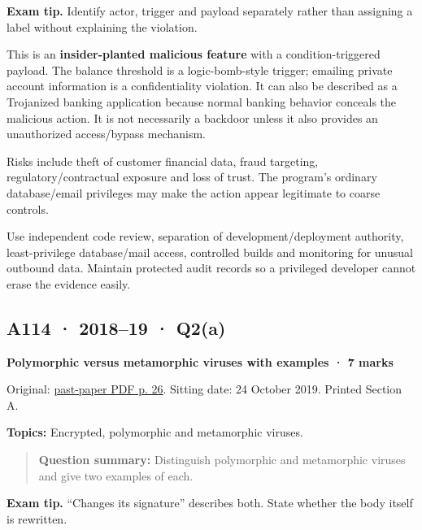 \documentclass[11pt,a4paper]{article}
\begin{document}
{\color{ForestGreen}\textbf{Exam tip.} Identify actor,\allowbreak{} trigger and payload separately rather than assigning a label without explaining the violation.}


This is an \textbf{insider-planted malicious feature} with a condition-triggered payload. The balance threshold is a logic-bomb-style trigger; emailing private account information is a confidentiality violation. It can also be described as a Trojanized banking application because normal banking behavior conceals the malicious action. It is not necessarily a backdoor unless it also provides an unauthorized access/\allowbreak{}bypass mechanism.


Risks include theft of customer financial data,\allowbreak{} fraud targeting,\allowbreak{} regulatory/\allowbreak{}contractual exposure and loss of trust. The program's ordinary database/\allowbreak{}email privileges may make the action appear legitimate to coarse controls.


Use independent code review,\allowbreak{} separation of development/\allowbreak{}deployment authority,\allowbreak{} least-privilege database/\allowbreak{}mail access,\allowbreak{} controlled builds and monitoring for unusual outbound data. Maintain protected audit records so a privileged developer cannot erase the evidence easily.




\clearpage
\subsection{A114 · 2018–19 · Q2(a)}\label{a114}

\textbf{Polymorphic versus metamorphic viruses with examples · 7 marks}


Original: \href{../../CSE405-Security_Merged.pdf\#page=26}{past-paper PDF p. 26}. Sitting date: 24 October 2019. Printed Section A.


\textbf{Topics:} Encrypted,\allowbreak{} polymorphic and metamorphic viruses.



\begin{quote}\small

\textbf{Question summary:} Distinguish polymorphic and metamorphic viruses and give two examples of each.



\end{quote}


{\color{ForestGreen}\textbf{Exam tip.} “Changes its signature” describes both. State whether the body itself is rewritten.}
\end{document}
